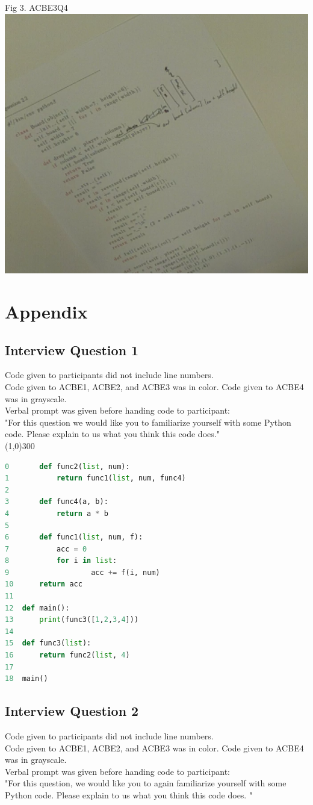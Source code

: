\documentclass{article}
\begin{document}
\newpage
Fig 3. ACBE3Q4 \\
\includegraphics[scale=0.7]{ACBE3Q4.png}
\newpage
\section{Appendix}
\subsection{Interview Question 1}
Code given to participants did not include line numbers. \\
Code given to ACBE1, ACBE2, and ACBE3 was in color. Code given to ACBE4 was in grayscale. \\
Verbal prompt was given before handing code to participant: \\
"For this question we would like you to familiarize yourself with some Python code. Please explain to us what you think this code does." \\
\line(1,0){300}
\begin{lstlisting}[language=python]
0		def func2(list, num):
1			return func1(list, num, func4)
2
3		def func4(a, b):
4			return a * b
5
6		def func1(list, num, f):
7			acc = 0
8			for i in list:
9					acc += f(i, num)
10		return acc
11
12	def main():
13		print(func3([1,2,3,4]))
14
15	def func3(list):
16		return func2(list, 4)
17
18	main()

\end{lstlisting}
\newpage
\subsection{Interview Question 2}
Code given to participants did not include line numbers. \\
Code given to ACBE1, ACBE2, and ACBE3 was in color. Code given to ACBE4 was in grayscale. \\
Verbal prompt was given before handing code to participant: \\
"For this question, we would like you to again familiarize yourself with some Python code. Please explain to us what you think this code does. " \\
\end{document}
